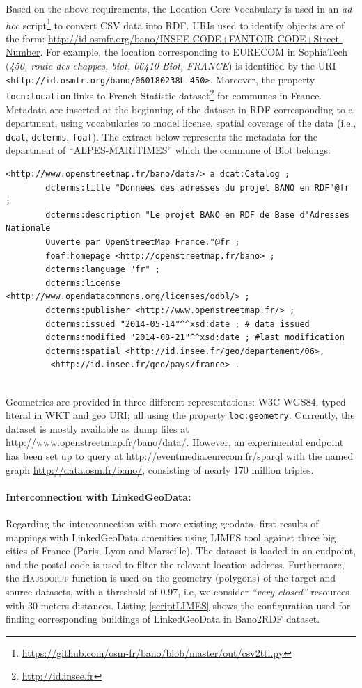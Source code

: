 Based on the above requirements, the Location Core Vocabulary \cite{locnvocab} is used in an \textit{ad-hoc} script\footnote{\url{https://github.com/osm-fr/bano/blob/master/out/csv2ttl.py}} to convert CSV data into RDF. URIs used to identify objects are of the form: \url{http://id.osmfr.org/bano/INSEE-CODE+FANTOIR-CODE+Street-Number}. For example, the location corresponding to EURECOM in SophiaTech (\textit{450, route des chappes, biot, 06410 Biot, FRANCE}) is identified by the URI \\
\texttt{<http://id.osmfr.org/bano/060180238L-450>}. Moreover, the property \\ \texttt{locn:location} links to French Statistic dataset\footnote{\url{http://id.insee.fr}} for communes in France. Metadata are inserted at the beginning of the dataset in RDF corresponding to a department, using vocabularies to model license, spatial coverage of the data (i.e., \texttt{dcat}, \texttt{dcterms}, \texttt{foaf}). The extract below represents the metadata for the department of ``ALPES-MARITIMES'' which the commune of Biot belongs:

\begin{verbatim}
<http://www.openstreetmap.fr/bano/data/> a dcat:Catalog ;
		dcterms:title "Donnees des adresses du projet BANO en RDF"@fr ;
		dcterms:description "Le projet BANO en RDF de Base d'Adresses Nationale 
		Ouverte par OpenStreetMap France."@fr ;
		foaf:homepage <http://openstreetmap.fr/bano> ;
		dcterms:language "fr" ;
		dcterms:license <http://www.opendatacommons.org/licenses/odbl/> ;
		dcterms:publisher <http://www.openstreetmap.fr/> ; 
		dcterms:issued "2014-05-14"^^xsd:date ; # data issued
		dcterms:modified "2014-08-21"^^xsd:date ; #last modification
		dcterms:spatial <http://id.insee.fr/geo/departement/06>,
		 <http://id.insee.fr/geo/pays/france> .
		
\end{verbatim}   

Geometries are provided in three different representations: W3C WGS84, typed literal in WKT and geo URI; all using the property \texttt{loc:geometry}. Currently, the dataset is mostly available as dump files at \url{http://www.openstreetmap.fr/bano/data/}. However, an experimental endpoint has been set up to query at \url{http://eventmedia.eurecom.fr/sparql } with the named graph \url{http://data.osm.fr/bano/}, consisting of nearly 170 million triples. 

\paragraph{Interconnection with LinkedGeoData:}
Regarding the interconnection with more existing geodata, first results of mappings with LinkedGeoData amenities using LIMES tool against three big cities of France (Paris, Lyon and Marseille). The dataset is loaded in an endpoint, and the postal code is used to filter the relevant location address. Furthermore, the \textsc{Hausdorff} function is used on the geometry (polygons) of the target and source datasets, with a threshold of 0.97, i.e, we consider \textit{``very closed''} resources with 30 meters distances. Listing \ref{scriptLIMES} shows the configuration used for finding corresponding buildings of LinkedGeoData in Bano2RDF dataset. 

